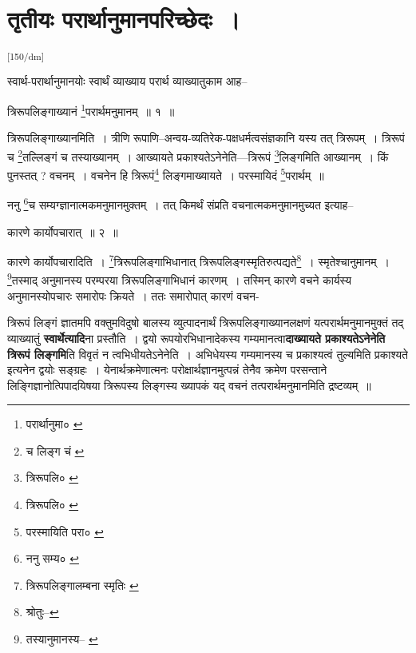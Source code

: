 \documentclass[article,12pt,a4paper]{memoir}
\begin{document}
	    
	    \begingroup
	    \beginnumbering%
	    
	  
\chapter[{तृतीयः परार्थानुमानपरिच्छेदः ।}]{तृतीयः परार्थानुमानपरिच्छेदः ।}\leavevmode\textsuperscript{\rmlatinfont\tiny [150/dm]}

	  \pstart स्वार्थ-परार्थानुमानयोः स्वार्थं व्याख्याय परार्थ व्याख्यातुकाम आह--
	\pend
       

	  \pstart त्रिरूपलिङ्गाख्यानं \footnote{परार्थानुमा० \cite{dp-msB} \cite{dp-edP} \cite{dp-edH} \cite{dp-edE} \cite{dp-edN}}परार्थमनुमानम् ॥ १ ॥
	\pend
       

	  \pstart त्रिरूपलिङ्गाख्यानमिति । त्रीणि रूपाणि--अन्वय-व्यतिरेक-पक्षधर्मत्वसंज्ञकानि यस्य तत् त्रिरूपम् । त्रिरूपं च \footnote{च लिङ्ग चं \cite{dp-msA}}तल्लिङ्गं च तस्याख्यानम् । आख्यायते प्रकाश्यतेऽनेनेति—त्रिरूपं \footnote{त्रिरूपलि० \cite{dp-edE}}लिङ्गमिति आख्यानम् । किं पुनस्तत् ? वचनम् । वचनेन हि त्रिरूपं\footnote{त्रिरूपलि० \cite{dp-msC}} लिङ्गमाख्यायते । परस्मायिदं \footnote{परस्मायिति परा० \cite{dp-edE}}परार्थम् ॥
	\pend
       

	  \pstart ननु \footnote{ननु सम्य० \cite{dp-msA}}च सम्यग्ज्ञानात्मकमनुमानमुक्तम् । तत् किमर्थं संप्रति वचनात्मकमनुमानमुच्यत इत्याह--
	\pend
       

	  \pstart कारणे कार्योपचारात् ॥ २ ॥
	\pend
       

	  \pstart कारणे कार्योपचारादिति । \footnote{त्रिरूपलिङ्गालम्बना स्मृतिः \cite{dp-msC} \cite{dp-msD} \cite{dp-msB}}त्रिरूपलिङ्गाभिधानात् त्रिरूपलिङ्गस्मृतिरुत्पद्यते\footnote{श्रोतुः--\cite{dp-msD-n}} । स्मृतेश्चानुमानम् । \footnote{तस्यानुमानस्य--\cite{dp-msA} \cite{dp-msB} \cite{dp-edP} \cite{dp-edH} \cite{dp-edE} \cite{dp-edN}}तस्माद् अनुमानस्य परम्परया त्रिरूपलिङ्गाभिधानं कारणम् । तस्मिन् कारणे वचने कार्यस्य अनुमानस्योपचारः समारोपः क्रियते । ततः समारोपात् कारणं वचन-
	\pend
      

	  \pstart त्रिरूपं लिङ्गं ज्ञातमपि वक्तुमविदुषो बालस्य व्युत्पादनार्थं त्रिरूपलिङ्गाख्यानलक्षणं यत्परार्थमनुमानमुक्तं तद् व्याख्यातुं \textbf{स्वार्थेत्यादि}ना प्रस्तौति । द्वयो रूपयोरभिधानादेकस्य गम्यमानत्वा\textbf{दाख्यायते प्रकाश्यतेऽनेनेति त्रिरूपं लिङ्गमि}ति विवृतं न त्वभिधीयतेऽनेनेति । अभिधेयस्य गम्यमानस्य च प्रकाश्यत्वं तुल्यमिति प्रकाश्यते इत्यनेन द्वयोः सङ्ग्रहः । येनार्थक्रमेणात्मनः परोक्षार्थज्ञानमुत्पन्नं तेनैव क्रमेण परसन्ताने लिङ्गिज्ञानोत्पिपादयिषया त्रिरूपस्य लिङ्गस्य ख्यापकं यद् वचनं तत्परार्थमनुमानमिति द्रष्टव्यम् ॥
	\pend
      
\end{document}
